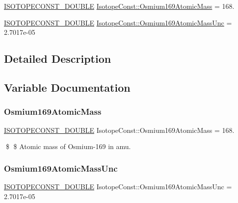 \begin{DoxyCompactItemize}
\item 
\mbox{\hyperlink{group___isotope_const-_macros_ga8f45a7272ce02c0b4c65c44636ed719a}{I\+S\+O\+T\+O\+P\+E\+C\+O\+N\+S\+T\+\_\+\+D\+O\+U\+B\+LE}} \mbox{\hyperlink{group___isotope_const-_osmium-_os169_ga43fca3897b5a93c54e5baf7a4651d784}{Isotope\+Const\+::\+Osmium169\+Atomic\+Mass}} = 168.
\item 
\mbox{\hyperlink{group___isotope_const-_macros_ga8f45a7272ce02c0b4c65c44636ed719a}{I\+S\+O\+T\+O\+P\+E\+C\+O\+N\+S\+T\+\_\+\+D\+O\+U\+B\+LE}} \mbox{\hyperlink{group___isotope_const-_osmium-_os169_ga7605cac6ad204c08b7726299f87a9475}{Isotope\+Const\+::\+Osmium169\+Atomic\+Mass\+Unc}} = 2.\+7017e-\/05
\end{DoxyCompactItemize}


\subsection{Detailed Description}


\subsection{Variable Documentation}
\mbox{\label{group___isotope_const-_osmium-_os169_ga43fca3897b5a93c54e5baf7a4651d784}} 
\subsubsection{\texorpdfstring{Osmium169\+Atomic\+Mass}{Osmium169AtomicMass}}
{\footnotesize\ttfamily \mbox{\hyperlink{group___isotope_const-_macros_ga8f45a7272ce02c0b4c65c44636ed719a}{I\+S\+O\+T\+O\+P\+E\+C\+O\+N\+S\+T\+\_\+\+D\+O\+U\+B\+LE}} Isotope\+Const\+::\+Osmium169\+Atomic\+Mass = 168.}

\$ \$ Atomic mass of Osmium-\/169 in amu. \mbox{\label{group___isotope_const-_osmium-_os169_ga7605cac6ad204c08b7726299f87a9475}} 
\subsubsection{\texorpdfstring{Osmium169\+Atomic\+Mass\+Unc}{Osmium169AtomicMassUnc}}
{\footnotesize\ttfamily \mbox{\hyperlink{group___isotope_const-_macros_ga8f45a7272ce02c0b4c65c44636ed719a}{I\+S\+O\+T\+O\+P\+E\+C\+O\+N\+S\+T\+\_\+\+D\+O\+U\+B\+LE}} Isotope\+Const\+::\+Osmium169\+Atomic\+Mass\+Unc = 2.\+7017e-\/05}

